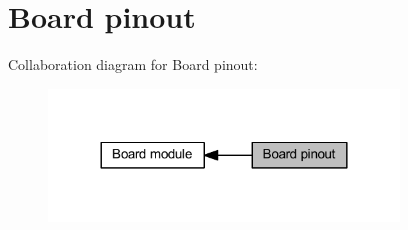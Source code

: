 \hypertarget{group___board__pinout__group}{}\section{Board pinout}
\label{group___board__pinout__group}
Collaboration diagram for Board pinout\+:\nopagebreak
\begin{figure}[H]
\begin{center}
\leavevmode
\includegraphics[width=264pt]{group___board__pinout__group}
\end{center}
\end{figure}
